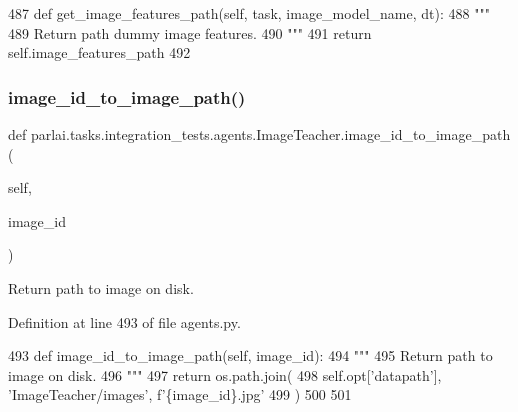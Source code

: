 \begin{DoxyCode}
487     \textcolor{keyword}{def }get\_image\_features\_path(self, task, image\_model\_name, dt):
488         \textcolor{stringliteral}{"""}
489 \textcolor{stringliteral}{        Return path dummy image features.}
490 \textcolor{stringliteral}{        """}
491         \textcolor{keywordflow}{return} self.image\_features\_path
492 
\end{DoxyCode}
\mbox{\label{classparlai_1_1tasks_1_1integration__tests_1_1agents_1_1ImageTeacher_a51df7dc7f9a019333479725f3e13653f}} 
\subsubsection{\texorpdfstring{image\+\_\+id\+\_\+to\+\_\+image\+\_\+path()}{image\_id\_to\_image\_path()}}
{\footnotesize\ttfamily def parlai.\+tasks.\+integration\+\_\+tests.\+agents.\+Image\+Teacher.\+image\+\_\+id\+\_\+to\+\_\+image\+\_\+path (\begin{DoxyParamCaption}\item[{}]{self,  }\item[{}]{image\+\_\+id }\end{DoxyParamCaption})}

\begin{DoxyVerb}Return path to image on disk.
\end{DoxyVerb}
 

Definition at line 493 of file agents.\+py.


\begin{DoxyCode}
493     \textcolor{keyword}{def }image\_id\_to\_image\_path(self, image\_id):
494         \textcolor{stringliteral}{"""}
495 \textcolor{stringliteral}{        Return path to image on disk.}
496 \textcolor{stringliteral}{        """}
497         \textcolor{keywordflow}{return} os.path.join(
498             self.opt[\textcolor{stringliteral}{'datapath'}], \textcolor{stringliteral}{'ImageTeacher/images'}, f\textcolor{stringliteral}{'\{image\_id\}.jpg'}
499         )
500 
501 
\end{DoxyCode}


